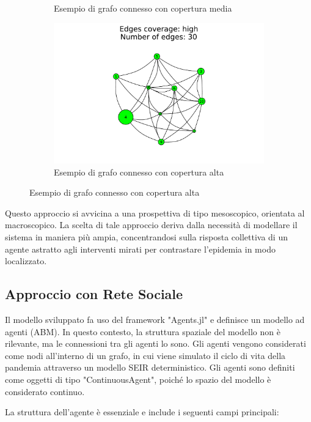 \begin{figure}[!hb]
\begin{subfigure}[b]{0.3\textwidth}
		\caption{Esempio di grafo connesso con copertura media}
		\label{fig:connected_graph_example_medium}
	\end{subfigure}
	\hfill
	\begin{subfigure}[b]{0.3\textwidth}
		\centering
		\includegraphics[width=\textwidth]{img/high.pdf}
		\caption{Esempio di grafo connesso con copertura alta}
		\label{fig:connected_graph_example_high}
	\end{subfigure}
\end{figure}

Questo approccio si avvicina a una prospettiva di tipo mesoscopico, 
orientata al macroscopico. La scelta di tale approccio deriva dalla 
necessità di modellare il sistema in maniera più ampia, concentrandosi 
sulla risposta collettiva di un agente astratto agli interventi mirati 
per contrastare l'epidemia in modo localizzato.

\subsection{Approccio con Rete Sociale}

Il modello sviluppato fa uso del framework "Agents.jl" \cite{Agents.jl} e 
definisce un modello ad agenti (ABM). In questo contesto, la struttura 
spaziale del modello non è rilevante, ma le connessioni tra gli agenti 
lo sono. Gli agenti vengono considerati come nodi all'interno di un grafo, 
in cui viene simulato il ciclo di vita della pandemia attraverso un 
modello SEIR deterministico. Gli agenti sono definiti come oggetti di tipo 
"ContinuousAgent", poiché lo spazio del modello è considerato continuo.

La struttura dell'agente è essenziale e include i seguenti campi principali:

